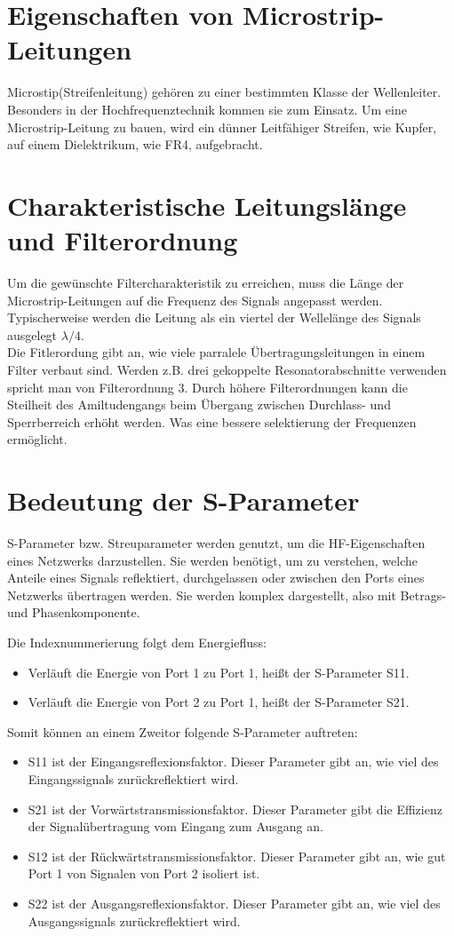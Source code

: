 \section{Eigenschaften von Microstrip-Leitungen}
Microstip(Streifenleitung) gehören zu einer bestimmten Klasse der Wellenleiter.
Besonders in der Hochfrequenztechnik kommen sie zum Einsatz.
Um eine Microstrip-Leitung zu bauen, wird ein dünner Leitfähiger Streifen, wie Kupfer, auf einem Dielektrikum, wie FR4, aufgebracht.
\newpage
\section{Charakteristische Leitungslänge und Filterordnung}
Um die gewünschte Filtercharakteristik zu erreichen,
muss die Länge der Microstrip-Leitungen auf die Frequenz des Signals angepasst werden.
Typischerweise werden die Leitung als ein viertel der Wellelänge des Signals ausgelegt
$\lambda/4$. 
\\
Die Fitlerordung gibt an, wie viele parralele Übertragungsleitungen in einem Filter verbaut sind.
Werden z.B. drei gekoppelte Resonatorabschnitte verwenden spricht man von Filterordnung 3.
Durch höhere Filterordnungen kann die Steilheit des Amiltudengangs beim Übergang zwischen Durchlass- und Sperrberreich erhöht werden.
Was eine bessere selektierung der Frequenzen ermöglicht.


\section{Bedeutung der S-Parameter}
S-Parameter bzw. Streuparameter werden genutzt, um die HF-Eigenschaften eines
Netzwerks darzustellen. Sie werden benötigt, um zu verstehen, welche Anteile eines Signals
reflektiert, durchgelassen oder zwischen den Ports eines Netzwerks übertragen werden.
Sie werden komplex dargestellt, also mit Betrags- und Phasenkomponente.

Die Indexnummerierung folgt dem Energiefluss:

\begin{itemize}
    \item Verläuft die Energie von Port 1 zu Port 1, heißt der S-Parameter S11.
    \item Verläuft die Energie von Port 2 zu Port 1, heißt der S-Parameter S21.
\end{itemize}
Somit können an einem Zweitor folgende S-Parameter auftreten:
\begin{itemize}
    \item S11 ist der Eingangsreflexionsfaktor. Dieser Parameter gibt an, wie viel des Eingangssignals zurückreflektiert wird.
    \item S21 ist der Vorwärtstransmissionsfaktor. Dieser Parameter gibt die Effizienz der Signalübertragung vom Eingang zum Ausgang an.
    \item S12 ist der Rückwärtstransmissionsfaktor. Dieser Parameter gibt an, wie gut Port 1 von Signalen von Port 2 isoliert ist.
    \item S22 ist der Ausgangsreflexionsfaktor. Dieser Parameter gibt an, wie viel des Ausgangssignals zurückreflektiert wird.
\end{itemize}

